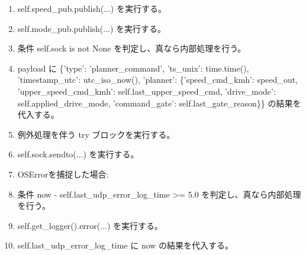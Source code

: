 \documentclass[a4paper,11pt]{article}
\begin{document}
\begin{enumerate}[leftmargin=1.8em]
\item self.speed\_pub.publish(...) を実行する。
\item self.mode\_pub.publish(...) を実行する。
\item 条件 self.sock is not None を判定し、真なら内部処理を行う。
\item   payload に \{'type': 'planner\_command', 'ts\_unix': time.time(), 'timestamp\_utc': utc\_iso\_now(), 'planner': \{'speed\_cmd\_kmh': speed\_out, 'upper\_speed\_cmd\_kmh': self.last\_upper\_speed\_cmd, 'drive\_mode': self.applied\_drive\_mode, 'command\_gate': self.last\_gate\_reason\}\} の結果を代入する。
\item   例外処理を伴う try ブロックを実行する。
\item     self.sock.sendto(...) を実行する。
\item     OSErrorを捕捉した場合:
\item     条件 now - self.last\_udp\_error\_log\_time >= 5.0 を判定し、真なら内部処理を行う。
\item       self.get\_logger().error(...) を実行する。
\item       self.last\_udp\_error\_log\_time に now の結果を代入する。
            \end{enumerate}
\end{document}
